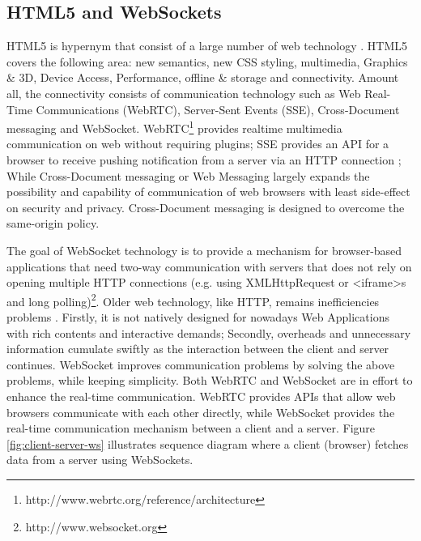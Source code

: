\subsection{HTML5 and WebSockets}
\label{HTML5andWebSockets}

HTML5 is hypernym that consist of a large number of web technology \cite{wang2012definitive}. HTML5 covers the following area: new semantics, new CSS styling, multimedia, Graphics \& 3D, Device Access, Performance, offline \& storage and connectivity. Amount all, the connectivity consists of communication technology such as Web Real-Time Communications (WebRTC), Server-Sent Events (SSE), Cross-Document messaging and WebSocket. WebRTC\footnote{http://www.webrtc.org/reference/architecture} provides realtime multimedia communication on web without requiring plugins; SSE provides an API for a browser to receive pushing notification from a server via an HTTP connection \cite{hickson2009server}; While Cross-Document messaging or Web Messaging largely expands the possibility and capability of communication of web browsers with least side-effect on security and privacy. Cross-Document messaging is designed to overcome the same-origin policy.

The goal of WebSocket technology is to provide a mechanism for browser-based applications that need two-way communication with servers that does not rely on opening multiple HTTP connections (e.g. using XMLHttpRequest or <iframe>s and long polling)\footnote{http://www.websocket.org}. Older web technology, like HTTP, remains inefficiencies problems \cite{wang2012definitive}. Firstly, it is not natively designed for nowadays Web Applications with rich contents and interactive demands; Secondly, overheads and unnecessary information cumulate swiftly as the interaction between the client and server continues. WebSocket improves communication problems by solving the above problems, while keeping simplicity. Both WebRTC and WebSocket are in effort to enhance the real-time communication. WebRTC provides APIs that allow web browsers communicate with each other directly, while WebSocket provides the real-time communication mechanism between a client and a server. Figure \ref{fig:client-server-ws} illustrates sequence diagram where a client (browser) fetches data from a server using WebSockets.

